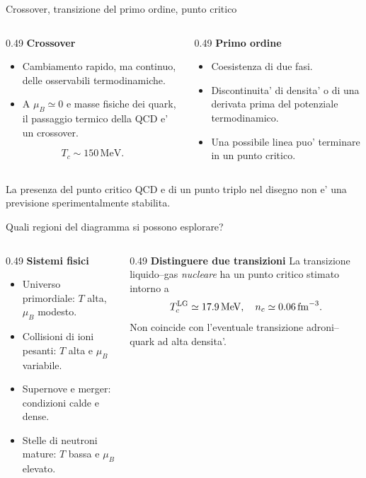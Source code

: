 \begin{frame}{Crossover, transizione del primo ordine, punto critico}
\small
\begin{columns}[T,onlytextwidth]
\begin{column}{0.49\textwidth}
\textbf{Crossover}
\begin{itemize}
\item Cambiamento rapido, ma continuo, delle osservabili termodinamiche.
\item A $\mu_B\simeq0$ e masse fisiche dei quark, il passaggio termico della QCD e' un crossover.
\end{itemize}
\[
T_c\sim150\,\mathrm{MeV}.
\]
\end{column}
\begin{column}{0.49\textwidth}
\textbf{Primo ordine}
\begin{itemize}
\item Coesistenza di due fasi.
\item Discontinuita' di densita' o di una derivata prima del potenziale termodinamico.
\item Una possibile linea puo' terminare in un punto critico.
\end{itemize}
\end{column}
\end{columns}
\medskip
La presenza del punto critico QCD e di un punto triplo nel disegno
non e' una previsione sperimentalmente stabilita.
\end{frame}

\begin{frame}{Quali regioni del diagramma si possono esplorare?}
\small
\begin{columns}[T,onlytextwidth]
\begin{column}{0.49\textwidth}
\textbf{Sistemi fisici}
\begin{itemize}
\item Universo primordiale: $T$ alta, $\mu_B$ modesto.
\item Collisioni di ioni pesanti: $T$ alta e $\mu_B$ variabile.
\item Supernove e merger: condizioni calde e dense.
\item Stelle di neutroni mature: $T$ bassa e $\mu_B$ elevato.
\end{itemize}
\end{column}
\begin{column}{0.49\textwidth}
\textbf{Distinguere due transizioni}
\medskip
La transizione liquido--gas \emph{nucleare} ha un punto critico stimato intorno a
\[
T_c^{\rm LG}\simeq17.9\,\mathrm{MeV},
\quad n_c\simeq0.06\,\mathrm{fm}^{-3}.
\]
Non coincide con l'eventuale transizione adroni--quark ad alta densita'.
\end{column}
\end{columns}
\end{frame}


